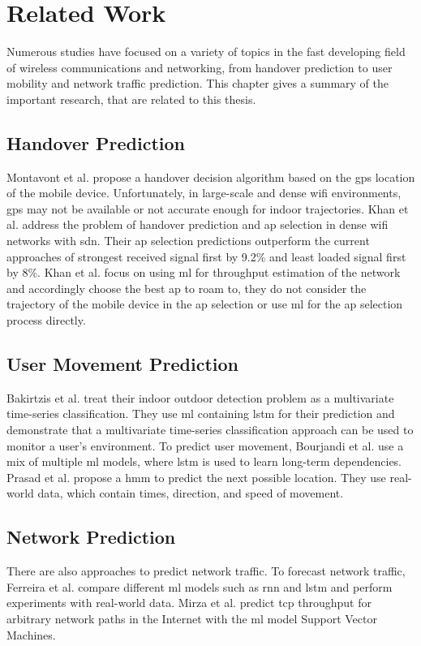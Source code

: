 \chapter{Related Work}\label{ch:related-work}

Numerous studies have focused on a variety of topics in the fast developing field of wireless communications and networking, from handover prediction to user mobility and network traffic prediction.
This chapter gives a summary of the important research, that are related to this thesis.

\section{Handover Prediction}

Montavont et al. \cite{handover-assisted-by-gps} propose a handover decision algorithm based on the \ac{gps} location of the mobile device.
Unfortunately, in large-scale and dense \ac{wifi} environments, \ac{gps} may not be available or not accurate enough for indoor trajectories.
Khan et al. \cite{MLBasedHandoverPrediction2022} address the problem of handover prediction and \ac{ap} selection in dense \ac{wifi} networks with \ac{sdn}.
Their \ac{ap} selection predictions outperform the current approaches of strongest received signal first by 9.2\% and least loaded signal first by 8\%.
Khan et al. focus on using \ac{ml} for throughput estimation of the network and accordingly choose the best \ac{ap} to roam to, they do not consider the trajectory of the mobile device in the \ac{ap} selection or use \ac{ml} for the \ac{ap} selection process directly.

\section{User Movement Prediction}

Bakirtzis et al. \cite{multivariate-lstm-indoor-outdoor} treat their indoor outdoor detection problem as a multivariate time-series classification.
They use \ac{ml} containing \ac{lstm} for their prediction and demonstrate that a multivariate time-series classification approach can be used to monitor a user's environment.
To predict user movement, Bourjandi et al. \cite{bourjandiPredictingUserMovement2022} use a mix of multiple \ac{ml} models, where \ac{lstm} is used to learn long-term dependencies.
Prasad et al. \cite{hmm-movement-prediction} propose a \ac{hmm} to predict the next possible location.
They use real-world data, which contain times, direction, and speed of movement.

\section{Network Prediction}

There are also approaches to predict network traffic.
To forecast network traffic, Ferreira et al. \cite{ferreiraForecastingNetworkTraffic2023} compare different \ac{ml} models such as \ac{rnn} and \ac{lstm} and perform experiments with real-world data.
Mirza et al. \cite{mirzaMachineLearningApproach2007} predict \ac{tcp} throughput for arbitrary network paths in the Internet with the \ac{ml} model Support Vector Machines.

